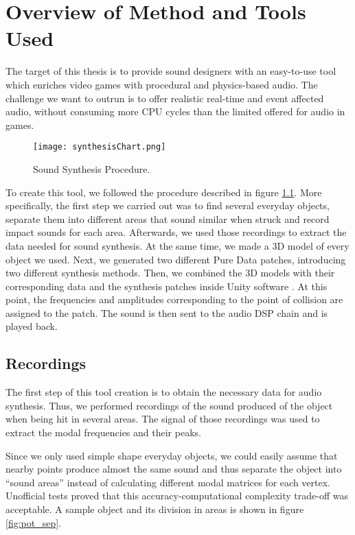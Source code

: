 \chapter{Overview of Method and Tools Used}\label{ch:method}
The target of this thesis is to provide sound designers with an easy-to-use tool which enriches video games with procedural and physics-based audio. The challenge we want to outrun is to offer realistic real-time and event affected audio, without consuming more CPU cycles than the limited offered for audio in games.

\begin{figure}[H]
  \centering
    \texttt{[image: synthesisChart.png]}
      \caption{Sound Synthesis Procedure.}
      \label{fig:synth_proc}
\end{figure}

To create this tool, we followed the procedure described in figure \ref{fig:synth_proc}. More specifically, the first step we carried out was to find several everyday objects, separate them into different areas that sound similar when struck and record impact sounds for each area. Afterwards, we used those recordings to extract the data needed for sound synthesis. At the same time, we made a 3D model of every object we used. Next, we generated two different Pure Data patches, introducing two different synthesis methods. Then, we combined the 3D models with their corresponding data and the synthesis patches inside Unity\textsuperscript{\textregistered} software \cite{bib:unity}. At this point, the frequencies and amplitudes corresponding to the point of collision are assigned to the patch. The sound is then sent to the audio DSP chain and is played back. 

\section{Recordings}
The first step of this tool creation is to obtain the necessary data for audio synthesis. Thus, we performed recordings of the sound produced of the object when being hit in several areas. The signal of those recordings was used to extract the modal frequencies and their peaks. 

Since we only used simple shape everyday objects, we could easily assume that nearby points produce almost the same sound and thus separate the object into ``sound areas'' instead of calculating different modal matrices for each vertex. Unofficial tests proved that this accuracy-computational complexity trade-off was acceptable. A sample object and its division in areas is shown in figure \ref{fig:pot_sep}.


